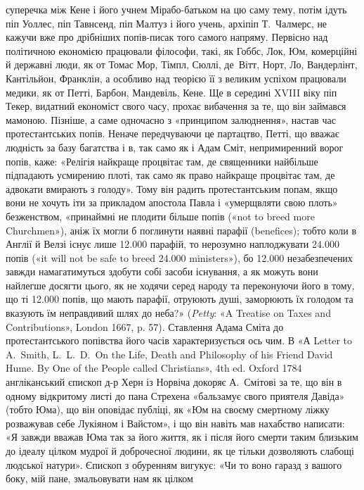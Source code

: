 {суперечка між Кене і його учнем Мірабо-батьком на цю саму тему,
потім ідуть піп Уоллес, піп Тавнсенд, піп Малтуз і його учень, архіпіп
Т.~Чалмерс, не кажучи вже про дрібніших попів-писак того самого напряму.
Первісно над політичною економією працювали філософи, такі,
як Гоббс, Лок, Юм, комерційні й державні люди, як от Томас Мор, Тімпл,
Сюллі, де~Вітт, Норт, Ло, Вандерлінт, Кантільйон, Франклін, а особливо
над теорією її з великим успіхом працювали медики, як от Петті, Барбон,
Мандевіль, Кене. Ще в середині XVIII віку піп Текер, видатний економіст
свого часу, прохає вибачення за те, що він займався мамоною. Пізніше,
а саме одночасно з «принципом залюднення», настав час протестантських
попів. Неначе передчуваючи це партацтво, Петті, що вважає людність
за базу багатства і в, так само як і Адам Сміт, непримиренний
ворог попів, каже: «Релігія найкраще процвітає там, де священники найбільше
підпадають усмирению плоті, так само як право найкраще процвітає
там, де адвокати вмирають з голоду». Тому він радить протестантським
попам, якщо вони не хочуть іти за прикладом апостола Павла
і «умерщвляти свою плоть» безженством, «принаймні не плодити більше
попів («not to breed more Churchmen»), аніж їх могли б поглинути наявні
парафії (benefices); тобто коли в Англії й Велзі існує лише \num{12.000} парафій,
то нерозумно наплоджувати \num{24.000} попів («it will not be safe to breed
\num{24.000} ministers»), бо \num{12.000} незабезпечених завжди намагатимуться
здобути собі засоби існування, а як можуть вони найлегше досягти цього,
як не ходячи серед народу та переконуючи його в тому, що ті \num{12.000} попів,
що мають парафії, отруюють душі, заморюють їх голодом та вказують
їм неправдивий шлях до неба?» (\emph{Petty}: «A Treatise on Taxes and
Contributions», London 1667, p. 57). Ставлення Адама Сміта до протестантського
попівства його часів характеризується ось чим. В «А Letter to A.~Smith,
L.~L.~D.~On the Life, Death and Philosophy of his Friend David Hume.
By One of the People called Christians», 4th ed. Oxford 1784 англіканський
єпископ д-р Херн із Норвіча докоряє А.~Смітові за те, що він в одному
відкритому листі до пана Стрехена «бальзамує свого приятеля Давіда»
(тобто Юма), що він оповідає публіці, як «Юм на своєму смертному ліжку
розважував себе Лукіяном і Вайстом», і що він навіть мав нахабство написати:
«Я завжди вважав Юма так за його життя, як і після його смерти
таким близьким до ідеалу цілком мудрої й доброчесної людини, як це тільки
дозволяють слабощі людської натури». Єпископ з обуренням вигукує:
«Чи то воно гаразд з вашого боку, мій пане, змальовувати нам як цілком
}
